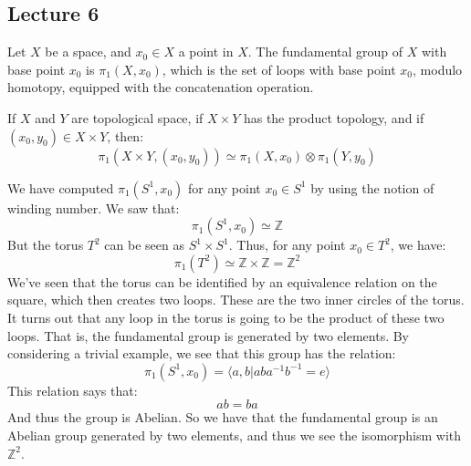 \documentclass{book}                                                           %
\begin{document}
    \subsection{Lecture 6}
        Let $X$ be a space, and $x_{0}\in{X}$ a point in $X$.
        The fundamental group of $X$ with base point $x_{0}$
        is $\pi_{1}(X,x_{0})$, which is the set of loops with
        base point $x_{0}$, modulo homotopy, equipped with the
        concatenation operation.
        \begin{theorem}
            If $X$ and $Y$ are topological space, if
            $X\times{Y}$ has the product topology, and if
            $(x_{0},y_{0})\in{X}\times{Y}$, then:
            \begin{equation}
                \pi_{1}(X\times{Y},(x_{0},y_{0}))
                \simeq\pi_{1}(X,x_{0})\otimes\pi_{1}(Y,y_{0})
            \end{equation}
        \end{theorem}
        \begin{example}
            We have computed $\pi_{1}(S^{1},x_{0})$ for any
            point $x_{0}\in{S}^{1}$ by using the notion of
            winding number. We saw that:
            \begin{equation}
                \pi_{1}(S^{1},x_{0})\simeq\mathbb{Z}
            \end{equation}
            But the torus $T^{2}$ can be seen as
            $S^{1}\times{S}^{1}$. Thus, for any point
            $x_{0}\in{T}^{2}$, we have:
            \begin{equation}
                \pi_{1}(T^{2})\simeq
                \mathbb{Z}\times\mathbb{Z}
                =\mathbb{Z}^{2}
            \end{equation}
            We've seen that the torus can be identified by
            an equivalence relation on the square, which then
            creates two loops. These are the two inner circles
            of the torus. It turns out that any loop in the
            torus is going to be the product of these two loops.
            That is, the fundamental group is generated by
            two elements. By considering a trivial example,
            we see that this group has the relation:
            \begin{equation}
                \pi_{1}(S^{1},x_{0})=
                \langle{a,b}|aba^{-1}b^{-1}=e\rangle
            \end{equation}
            This relation says that:
            \begin{equation}
                ab=ba
            \end{equation}
            And thus the group is Abelian. So we have that
            the fundamental group is an Abelian group
            generated by two elements, and thus we see the
            isomorphism with $\mathbb{Z}^{2}$.
        \end{example}
\end{document}
